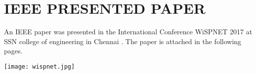 \thispagestyle{empty}
\pagestyle{empty}
\chapter{IEEE PRESENTED PAPER}
An IEEE paper was presented in the International Conference WiSPNET 2017 at SSN college of engineering in Chennai  . The paper is attached in the following pages.


\centering	
\texttt{[image: wispnet.jpg]} %
	

